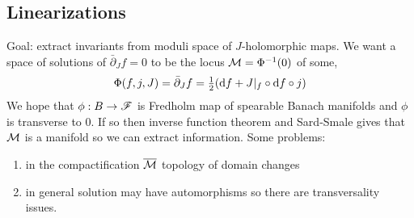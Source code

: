 \documentclass[12pt]{article}
\newcommand{\dbar}{\bar{\partial}}
\begin{document}
\subsection{Linearizations}

Goal: extract invariants from moduli space of $J$-holomorphic maps. We want a space of solutions of $\dbar_J f = 0$ to be the locus $\mathcal{M} = \Phi^{-1}(0)$ of some,
\[ \Phi(f, j, J) = \dbar_J f = \tfrac{1}{2} (\d{f} + J |_f \circ \d{f} \circ j) \]
We hope that $\phi : B \to \mathscr{F}$ is Fredholm map of spearable Banach manifolds and $\phi$ is transverse to $0$. If so then inverse function theorem and Sard-Smale gives that $\mathcal{M}$ is a manifold so we can extract information. Some problems:

\newcommand{\bb}{\mathbb}

\begin{enumerate}
\item in the compactification $\overline{\mathcal{M}}$ topology of domain changes 
\item in general solution may have automorphisms so there are transversality issues. 
\end{enumerate}
\end{document}
